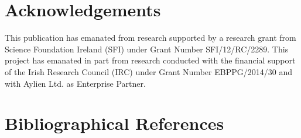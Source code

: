 \documentclass[10pt, a4paper]{article}
\begin{document}
\section*{Acknowledgements}

This publication has emanated from research supported by a research grant from Science Foundation Ireland (SFI) under Grant Number SFI/12/RC/2289.
This project has emanated in part from research conducted with the financial support of the Irish Research Council (IRC) under Grant Number EBPPG/2014/30 and with Aylien Ltd. as Enterprise Partner. 

\section{Bibliographical References}
\label{m%
%
%
ain:ref}


% 

\end{document}
